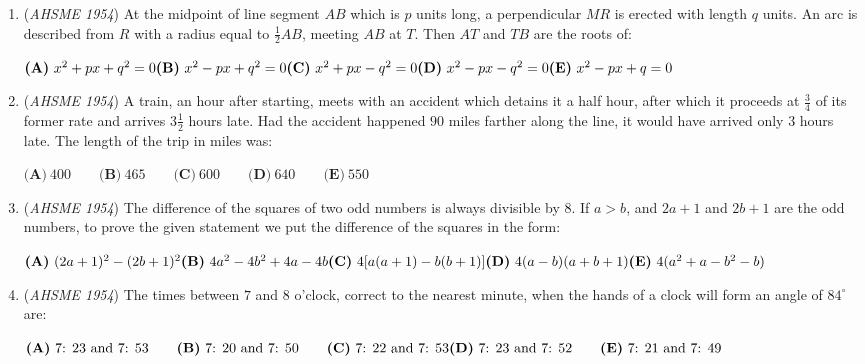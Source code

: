 \begin{enumerate}
$\textbf{(A)}\ \frac{3}{16}"\qquad\textbf{(B)}\ \frac{1}{8}"\qquad\textbf{(C)}\ \frac{1}{32}"\qquad\textbf{(D)}\ \frac{3}{32}"\qquad\textbf{(E)}\ \frac{1}{16}"$


	\item (\textit{AHSME 1954}) At the midpoint of line segment $AB$ which is $p$ units long, a perpendicular $MR$ is erected with length $q$ units. 
An arc is described from $R$ with a radius equal to $\frac{1}{2}AB$, meeting $AB$ at $T$. Then $AT$ and $TB$ are the roots of: 


 $\textbf{(A)}\ x^2+px+q^2=0\\ \textbf{(B)}\ x^2-px+q^2=0\\ \textbf{(C)}\ x^2+px-q^2=0\\ \textbf{(D)}\ x^2-px-q^2=0\\ \textbf{(E)}\ x^2-px+q=0$


	\item (\textit{AHSME 1954}) A train, an hour after starting, meets with an accident which detains it a half hour, after which it 
proceeds at $\frac{3}{4}$ of its former rate and arrives $3\frac{1}{2}$ hours late. 
Had the accident happened $90$ miles farther along the line, it would have arrived only $3$ hours late. The length of the trip in miles was: 


 $\textbf{(A)}\ 400 \qquad \textbf{(B)}\ 465 \qquad \textbf{(C)}\ 600 \qquad \textbf{(D)}\ 640 \qquad \textbf{(E)}\ 550$


	\item (\textit{AHSME 1954}) The difference of the squares of two odd numbers is always divisible by $8$. If $a>b$, and $2a+1$ and $2b+1$ are the odd numbers, 
to prove the given statement we put the difference of the squares in the form: 


 $\textbf{(A)}\ (2a+1)^2-(2b+1)^2\\ \textbf{(B)}\ 4a^2-4b^2+4a-4b\\ \textbf{(C)}\ 4[a(a+1)-b(b+1)]\\ \textbf{(D)}\ 4(a-b)(a+b+1)\\ \textbf{(E)}\ 4(a^2+a-b^2-b)$


	\item (\textit{AHSME 1954}) The times between $7$ and $8$ o'clock, correct to the nearest minute, when the hands of a clock will form an angle of $84^{\circ}$ are: 


 $\textbf{(A)}\ \text{7: 23 and 7: 53}\qquad \textbf{(B)}\ \text{7: 20 and 7: 50}\qquad \textbf{(C)}\ \text{7: 22 and 7: 53}\\  \textbf{(D)}\ \text{7: 23 and 7: 52}\qquad \textbf{(E)}\ \text{7: 21 and 7: 49}$


\end{enumerate}